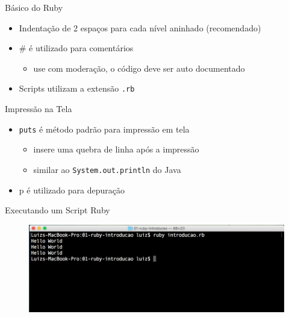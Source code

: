 \begin{frame}[fragile,t]{Básico do Ruby}
  \begin{itemize}
    \item Indentação de 2 espaços para cada nível aninhado (recomendado)
    \item \# é utilizado para comentários
    \begin{itemize}
    	\item use com moderação, o código deve ser auto documentado
    \end{itemize}
    \item Scripts utilizam a extensão \verb!.rb!
    
	
  \end{itemize}   
\end{frame}

\begin{frame}[fragile,t]{Impressão na Tela}
  \begin{itemize}
    \item \verb!puts! é método padrão para impressão em tela 
    \begin{itemize}
    	\item insere uma quebra de linha após a impressão
    	\item similar ao \verb!System.out.println! do Java
    \end{itemize}
    \item \alert{p} é utilizado para depuração
  \end{itemize}   
\end{frame}

\begin{frame}{Executando um Script Ruby}
  \begin{figure}[hbt]
    \includegraphics[scale=.25]{imagens/ruby-interpretador.png}
  \end{figure}
\end{frame}

